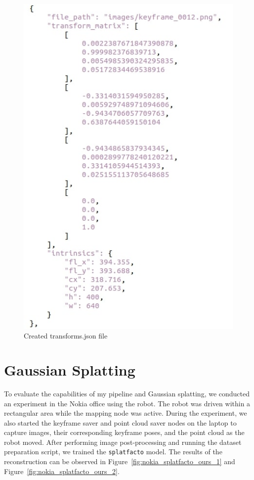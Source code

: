\begin{figure}[htbp]
	\centering
	\includegraphics[width=150mm, keepaspectratio]{figures_jpg/transforms_json.jpg}
	\caption{Created transforms.json file}
	\label{fig:transforms_json}
\end{figure}

\FloatBarrier
\section{Gaussian Splatting}

To evaluate the capabilities of my pipeline and Gaussian splatting, we conducted an experiment in the Nokia office using the robot. The robot was driven within a rectangular area while the mapping node was active. During the experiment, we also started the keyframe saver and point cloud saver nodes on the laptop to capture images, their corresponding keyframe poses, and the point cloud as the robot moved. After performing image post-processing and running the dataset preparation script, we trained the \verb|splatfacto| model. The results of the reconstruction can be observed in Figure~\ref{fig:nokia_splatfacto_ours_1} and Figure~\ref{fig:nokia_splatfacto_ours_2}.

